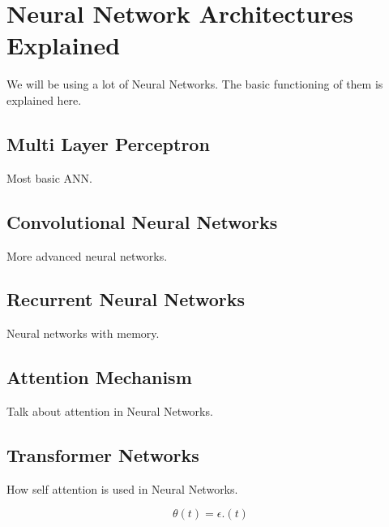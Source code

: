 \section{Neural Network Architectures Explained}
We will be using a lot of Neural Networks. The basic functioning of them is explained here.

\subsection{Multi Layer Perceptron}
Most basic ANN.

\subsection{Convolutional Neural Networks}
More advanced neural networks.

\subsection{Recurrent Neural Networks}
Neural networks with memory.

\subsection{Attention Mechanism}
Talk about attention in Neural Networks.

\subsection{Transformer Networks}
How self attention is used in Neural Networks.


\begin{equation}   
        \theta(t) = \epsilon.(t)
    \end{equation}  \\